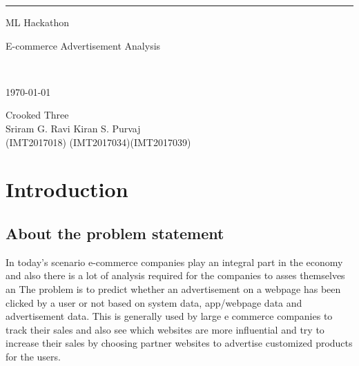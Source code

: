 \documentclass{scrreprt}
\date{}
\begin{document}
\begin{flushright}
    \rule{16cm}{5pt}\vskip1cm
    \begin{bfseries}
        \begin{Huge}{ML Hackathon \\ \begin{large}E-commerce Advertisement Analysis\end{large}\\}\end{Huge}
		\vspace{1.5cm}   
        \today\\
        \vspace{12cm}
        
		\begin{large}
		\begin{center}Crooked Three  \\     
          \vspace{1cm}
         Sriram G.  \hspace{3cm} Ravi Kiran \hspace{3cm} S. Purvaj\\
         (IMT2017018) \hspace{2.25cm}(IMT2017034)\hspace{2cm}(IMT2017039)\\
        \vspace{1.5cm}
		\end{center}
        \end{large}
    \end{bfseries}
\end{flushright}

\tableofcontents




\chapter{Introduction}

\section{About the problem statement}
In today's scenario e-commerce companies play an integral part in the economy and also there is a lot of analysis required for the companies to asses themselves  an The problem is to predict whether an advertisement on a webpage has been clicked by a user or not based on system data, app/webpage data and advertisement data. This is generally used by large e commerce companies to track their sales and also see which websites are more influential and try to increase their sales by choosing partner websites to advertise customized products for the users. 
\end{document}

